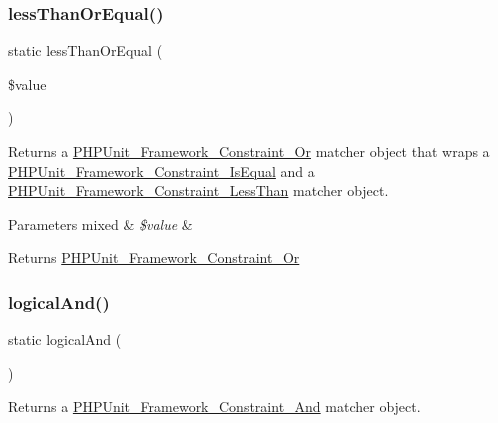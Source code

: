 \subsubsection{\texorpdfstring{less\+Than\+Or\+Equal()}{lessThanOrEqual()}}
{\footnotesize\ttfamily static less\+Than\+Or\+Equal (\begin{DoxyParamCaption}\item[{}]{\$value }\end{DoxyParamCaption})\hspace{0.3cm}{\ttfamily [static]}}

Returns a \mbox{\hyperlink{class_p_h_p_unit___framework___constraint___or}{P\+H\+P\+Unit\+\_\+\+Framework\+\_\+\+Constraint\+\_\+\+Or}} matcher object that wraps a \mbox{\hyperlink{class_p_h_p_unit___framework___constraint___is_equal}{P\+H\+P\+Unit\+\_\+\+Framework\+\_\+\+Constraint\+\_\+\+Is\+Equal}} and a \mbox{\hyperlink{class_p_h_p_unit___framework___constraint___less_than}{P\+H\+P\+Unit\+\_\+\+Framework\+\_\+\+Constraint\+\_\+\+Less\+Than}} matcher object.


\begin{DoxyParams}[1]{Parameters}
mixed & {\em \$value} & \\
\hline
\end{DoxyParams}
\begin{DoxyReturn}{Returns}
\mbox{\hyperlink{class_p_h_p_unit___framework___constraint___or}{P\+H\+P\+Unit\+\_\+\+Framework\+\_\+\+Constraint\+\_\+\+Or}} 
\end{DoxyReturn}
\mbox{\label{class_p_h_p_unit___framework___assert_af486c1f325181cf5b4544706b72a32de}} 
\subsubsection{\texorpdfstring{logical\+And()}{logicalAnd()}}
{\footnotesize\ttfamily static logical\+And (\begin{DoxyParamCaption}{ }\end{DoxyParamCaption})\hspace{0.3cm}{\ttfamily [static]}}

Returns a \mbox{\hyperlink{class_p_h_p_unit___framework___constraint___and}{P\+H\+P\+Unit\+\_\+\+Framework\+\_\+\+Constraint\+\_\+\+And}} matcher object.

